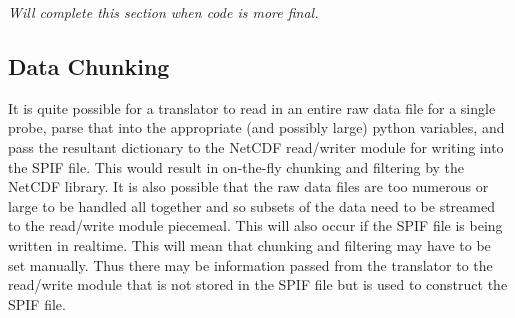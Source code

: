 \documentclass[12pt,a4paper]{article}
\begin{document}
\textit{Will complete this section when code is more final.}

\subsection{Data Chunking}

It is quite possible for a translator to read in an entire raw data file for a single probe, parse that into the appropriate (and possibly large) python variables, and pass the resultant dictionary to the NetCDF read/writer module for writing into the SPIF file. This would result in on-the-fly chunking and filtering by the NetCDF library. It is also possible that the raw data files are too numerous or large to be handled all together and so subsets of the data need to be streamed to the read/write module piecemeal. This will also occur if the SPIF file is being written in realtime. This will mean that chunking and filtering may have to be set manually. Thus there may be information passed from the translator to the read/write module that is not stored in the SPIF file but is used to construct the SPIF file.





\label{LastPage}
\end{document}
